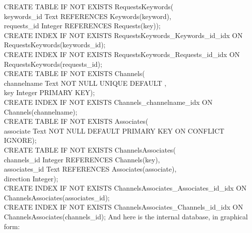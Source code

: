 CREATE TABLE IF NOT EXISTS RequestsKeywords(\\
\hspace*{\uL}keywords\_id Text REFERENCES Keywords(keyword),\\
\hspace*{\uL}requests\_id Integer REFERENCES Requests(key));\\
CREATE INDEX IF NOT EXISTS RequestsKeywords\_Keywords\_id\_idx ON\\
\hspace*{\uL}RequestsKeywords(keywords\_id);\\
CREATE INDEX IF NOT EXISTS RequestsKeywords\_Requests\_id\_idx ON\\
\hspace*{\uL}RequestsKeywords(requests\_id);\\
CREATE TABLE IF NOT EXISTS Channels(\\
\hspace*{\uL}channelname Text NOT NULL UNIQUE DEFAULT \fUS,\\
\hspace*{\uL}key Integer PRIMARY KEY);\\
CREATE INDEX IF NOT EXISTS Channels\_channelname\_idx ON Channels(channelname);\\
CREATE TABLE IF NOT EXISTS Associates(\\
\hspace*{\uL}associate Text NOT NULL DEFAULT \fUS{} PRIMARY KEY ON CONFLICT IGNORE);\\
CREATE TABLE IF NOT EXISTS ChannelsAssociates(\\
\hspace*{\uL}channels\_id Integer REFERENCES Channels(key),\\
\hspace*{\uL}associates\_id Text REFERENCES Associates(associate),\\
\hspace*{\uL}direction Integer);\\
CREATE INDEX IF NOT EXISTS ChannelsAssociates\_Associates\_id\_idx ON\\
\hspace*{\uL}ChannelsAssociates(associates\_id);\\
CREATE INDEX IF NOT EXISTS ChannelsAssociates\_Channels\_id\_idx ON\\
\hspace*{\uL}ChannelsAssociates(channels\_id);
\outputEnd{}
\newpage
And here is the internal database, in graphical form:\\
\appendixEnd{}

